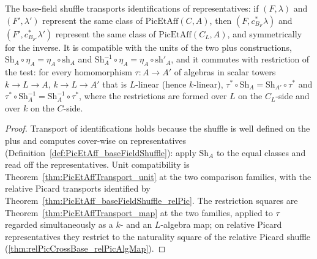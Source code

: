 \begin{theorem}
  \label{thm:PicEtAff_baseFieldShuffle_laws}
  \leanok
  The base-field shuffle transports identifications of representatives: if
  \((F, \lambda)\) and \((F', \lambda')\) represent the same class of
  \(\mathrm{PicEtAff}(C, A)\), then \((F, c_{B_F}^{*}\lambda)\) and
  \((F', c_{B_{F'}}^{*}\lambda')\) represent the same class of
  \(\mathrm{PicEtAff}(C_L, A)\), and symmetrically for the inverse. It is compatible
  with the units of the two plus constructions,
  \(\mathrm{Sh}_A \circ \eta_A = \eta_A \circ \mathrm{sh}_A\) and
  \(\mathrm{Sh}_A^{-1} \circ \eta_A = \eta_A \circ \mathrm{sh}'_A\), and it commutes
  with restriction of the test: for every homomorphism \(\tau \colon A \to A'\) of
  algebras in scalar towers \(k \to L \to A\), \(k \to L \to A'\) that is \(L\)-linear
  (hence \(k\)-linear),
  \(\tau^{*} \circ \mathrm{Sh}_A = \mathrm{Sh}_{A'} \circ \tau^{*}\) and
  \(\tau^{*} \circ \mathrm{Sh}_A^{-1} = \mathrm{Sh}_A^{-1} \circ \tau^{*}\), where the
  restrictions are formed over \(L\) on the \(C_L\)-side and over \(k\) on the
  \(C\)-side.
\end{theorem}
\begin{proof}
  \leanok
  Transport of identifications holds because the shuffle is well defined on the plus and
  computes cover-wise on representatives
  (Definition~\ref{def:PicEtAff_baseFieldShuffle}): apply \(\mathrm{Sh}_A\) to the equal
  classes and read off the representatives. Unit compatibility is
  Theorem~\ref{thm:PicEtAffTransport_unit} at the two comparison families, with the
  relative Picard transports identified by
  Theorem~\ref{thm:PicEtAff_baseFieldShuffle_relPic}. The restriction squares are
  Theorem~\ref{thm:PicEtAffTransport_map} at the two families, applied to \(\tau\)
  regarded simultaneously as a \(k\)- and an \(L\)-algebra map; on relative Picard
  representatives they restrict to the naturality square of the relative Picard shuffle
  (\ref{thm:relPicCrossBase_relPicAlgMap}).
\end{proof}

